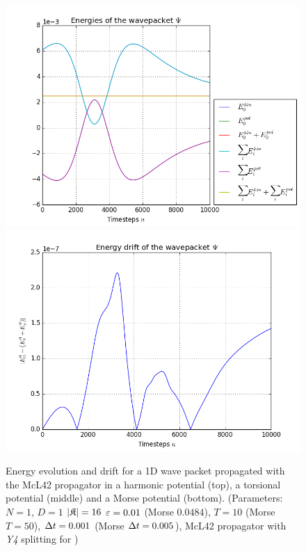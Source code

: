 \begin{figure}[ht]
	\includegraphics[width=.45\textwidth]{figures/morse_1D_McL42_energies.png}
	\includegraphics[width=.45\textwidth]{figures/morse_1D_McL42_drift.png}
	\caption{Energy evolution and drift for a 1D wave packet propagated with the McL42 propagator in a harmonic potential (top), a torsional potential (middle) and a Morse potential (bottom).
	(Parameters: $N=1$, $D=1$ $|\mathfrak{K}|=16$ $\varepsilon=0.01$ (Morse $0.0484$), $T=10$ (Morse $T=50$), $\Delta t=0.001$ (Morse $\Delta t=0.005$), McL42 propagator with \emph{Y4} splitting for )}
	\label{fig:energy_McL42}
\end{figure}
%
